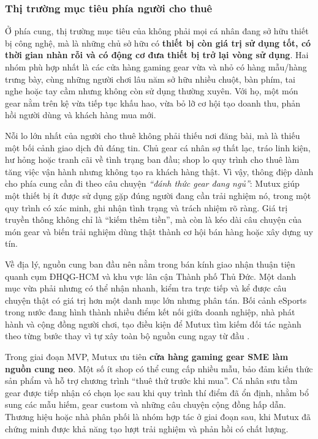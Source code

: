 \subsubsection{Thị trường mục tiêu phía người cho thuê}

Ở phía cung, thị trường mục tiêu của \projectname{} không phải mọi cá nhân đang sở hữu thiết bị công nghệ, mà là những chủ sở hữu có \textbf{thiết bị còn giá trị sử dụng tốt, có thời gian nhàn rỗi và có động cơ đưa thiết bị trở lại vòng sử dụng}. Hai nhóm phù hợp nhất là các cửa hàng gaming gear vừa và nhỏ có hàng mẫu/hàng trưng bày, cùng những người chơi lâu năm sở hữu nhiều chuột, bàn phím, tai nghe hoặc tay cầm nhưng không còn sử dụng thường xuyên. Với họ, một món gear nằm trên kệ vừa tiếp tục khấu hao, vừa bỏ lỡ cơ hội tạo doanh thu, phản hồi người dùng và khách hàng mua mới.

Nỗi lo lớn nhất của người cho thuê không phải thiếu nơi đăng bài, mà là thiếu một bối cảnh giao dịch đủ đáng tin. Chủ gear cá nhân sợ thất lạc, tráo linh kiện, hư hỏng hoặc tranh cãi về tình trạng ban đầu; shop lo quy trình cho thuê làm tăng việc vận hành nhưng không tạo ra khách hàng thật. Vì vậy, thông điệp dành cho phía cung cần đi theo câu chuyện \textit{``đánh thức gear đang ngủ''}: Mutux giúp một thiết bị ít được sử dụng gặp đúng người đang cần trải nghiệm nó, trong một quy trình có xác minh, ghi nhận tình trạng và trách nhiệm rõ ràng. Giá trị truyền thông không chỉ là ``kiếm thêm tiền'', mà còn là kéo dài câu chuyện của món gear và biến trải nghiệm dùng thật thành cơ hội bán hàng hoặc xây dựng uy tín.

Về địa lý, nguồn cung ban đầu nên nằm trong bán kính giao nhận thuận tiện quanh cụm ĐHQG-HCM và khu vực lân cận Thành phố Thủ Đức. Một danh mục vừa phải nhưng có thể nhận nhanh, kiểm tra trực tiếp và kể được câu chuyện thật có giá trị hơn một danh mục lớn nhưng phân tán. Bối cảnh eSports trong nước đang hình thành nhiều điểm kết nối giữa doanh nghiệp, nhà phát hành và cộng đồng người chơi, tạo điều kiện để Mutux tìm kiếm đối tác ngành theo từng bước thay vì tự xây toàn bộ nguồn cung ngay từ đầu \cite{baochinhphuGameverse2026}.

Trong giai đoạn MVP, Mutux ưu tiên \textbf{cửa hàng gaming gear SME làm nguồn cung neo}. Một số ít shop có thể cung cấp nhiều mẫu, bảo đảm kiến thức sản phẩm và hỗ trợ chương trình ``thuê thử trước khi mua''. Cá nhân sưu tầm gear được tiếp nhận có chọn lọc sau khi quy trình thí điểm đã ổn định, nhằm bổ sung các mẫu hiếm, gear custom và những câu chuyện cộng đồng hấp dẫn. Thương hiệu hoặc nhà phân phối là nhóm hợp tác ở giai đoạn sau, khi Mutux đã chứng minh được khả năng tạo lượt trải nghiệm và phản hồi có chất lượng.


